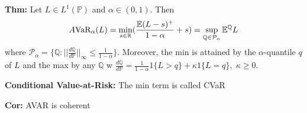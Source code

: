 \textbf{Thm:} Let $L \in L^1(\mathbb{P})$ and $\alpha \in (0, 1)$. Then
\[
    A\text{VaR}_\alpha(L) = \min_{s\in\mathbb{R}}(\frac{\mathbb{E} (L-s)^+}{1-\alpha}+s)\\
    = \sup_{\mathbb{Q}\in\mathcal{P}_{\alpha}}\mathbb{E}^{\mathbb{Q}}L
\]
where $\mathcal{P}_{\alpha}=\{\mathbb{Q}:||\frac{d\mathbb{Q}}{d\mathbb{P}}||_{\infty}\leq \frac{1}{1-\alpha}\}$. Moreover, the min is attained by the $\alpha$-quantile $q$ of $L$ and the max by any $\mathbb{Q}$ w $\frac{d\mathbb{Q}}{d\mathbb{P}}=\frac{1}{1-\alpha}1\{L>q\}+\kappa 1\{L=q\},\; \kappa\geq 0.$

\textbf{Conditional Value-at-Risk:} The min term is called CVaR

\textbf{Cor:} AVAR is coherent